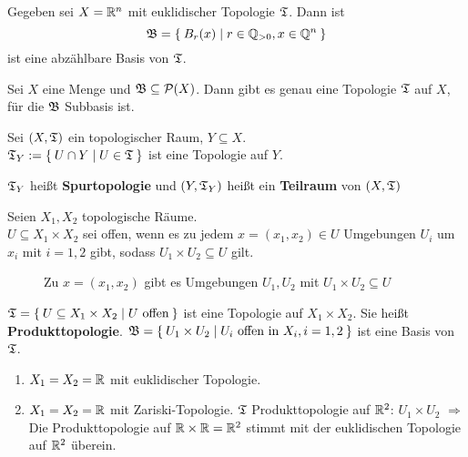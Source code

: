 \begin{beispiel}
    Gegeben sei $X = \mathbb{R}^n$ mit euklidischer Topologie $\mathfrak{T}$. Dann ist
    \[\mathfrak{B} = \Set{B_r(x) | r \in \ensuremath{\mathbb{Q}}_{> 0}, x \in \ensuremath{\mathbb{Q}}^n}\]
    ist eine abzählbare Basis von $\mathfrak{T}$.
\end{beispiel}

\begin{bemerkung}
    Sei $X$ eine Menge und $\mathfrak{B} \subseteq \mathcal{P}(X)$. Dann gibt es
    genau eine Topologie $\mathfrak{T}$ auf $X$, für die $\mathfrak{B}$ Subbasis ist.
\end{bemerkung}

\begin{definition}  
    Sei $(X, \mathfrak{T})$ ein topologischer Raum, $Y \subseteq X$.\\
    $\mathfrak{T}_Y := \Set{U \cap Y | U \in \mathfrak{T}}$ ist eine Topologie auf $Y$.

    $\mathfrak{T}_Y$ heißt \textbf{Spurtopologie} und $(Y, \mathfrak{T}_Y)$ heißt ein 
    \textbf{Teilraum} von $(X, \mathfrak{T})$
\end{definition}

\begin{definition} 
    Seien $X_1, X_2$ topologische Räume.\\
    $U \subseteq X_1 \times X_2$ sei offen, wenn es zu jedem $x = (x_1, x_2) \in U$
    Umgebungen $U_i$ um $x_i$  mit $i=1,2$ gibt, sodass $U_1 \times U_2 \subseteq U$
    gilt.

    \begin{figure}[htp]
        \centering
        
        \caption{Zu $x=(x_1, x_2)$ gibt es Umgebungen $U_1, U_2$ mit $U_1 \times U_2 \subseteq U$}
    \end{figure}

    $\mathfrak{T} = \Set{U \subseteq X_1 \times X_2 | U \text{ offen}}$
    ist eine Topologie auf $X_1 \times X_2$. Sie heißt \textbf{Produkttopologie}.
    $\mathfrak{B} = \Set{U_1 \times U_2 | U_i \text{ offen in } X_i, i=1,2}$
    ist eine Basis von $\mathfrak{T}$.
\end{definition}

\begin{beispiel}
    \begin{enumerate}[1)]
        \item $X_1 = X_2 = \mathbb{R}$ mit euklidischer Topologie.
        \item $X_1 = X_2 = \mathbb{R}$ mit Zariski-Topologie.
              $\mathfrak{T}$ Produkttopologie auf $\mathbb{R}^2$: $U_1 \times U_2$
              $\Rightarrow$ Die Produkttopologie auf $\mathbb{R} \times \mathbb{R} = \mathbb{R}^2$
              stimmt mit der euklidischen Topologie auf $\mathbb{R}^2$ überein.\\
    \end{enumerate}
\end{beispiel}

